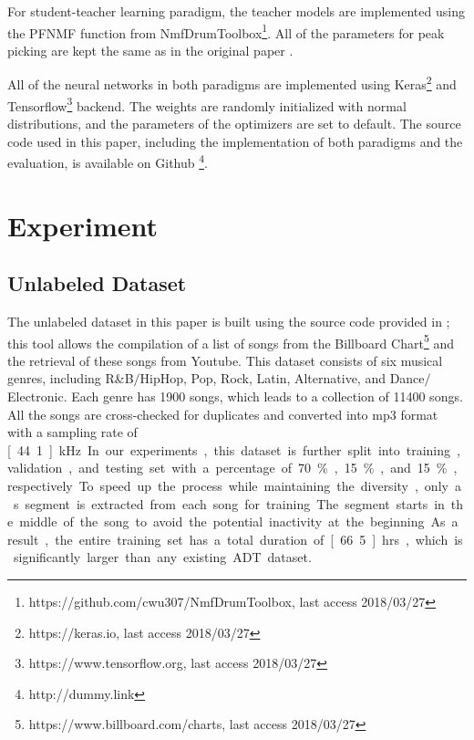\documentclass{article}
\begin{document}
For student-teacher learning paradigm, the teacher models are implemented using the PFNMF function from NmfDrumToolbox\footnote{https://github.com/cwu307/NmfDrumToolbox, last access 2018/03/27}. All of the parameters for peak picking are kept the same as in the original paper \cite{Wu2017}.

All of the neural networks in both paradigms are implemented using Keras\footnote{https://keras.io, last access 2018/03/27} and Tensorflow\footnote{https://www.tensorflow.org, last access 2018/03/27} backend. The weights are randomly initialized with normal distributions, and the parameters of the optimizers are set to default. The source code used in this paper, including the implementation of both paradigms and the evaluation, is available on Github \footnote{http://dummy.link}.

\section{Experiment}
\label{sec:experiment}

\subsection{Unlabeled Dataset}

The unlabeled dataset in this paper is built using the source code provided in \cite{Wu2017}; this tool allows the compilation of a list of songs from the Billboard Chart\footnote{https://www.billboard.com/charts, last access 2018/03/27} and the retrieval of these songs from Youtube. This dataset consists of six musical genres, including R\&B$\slash$HipHop, Pop, Rock, Latin, Alternative, and  Dance$\slash$Electronic. Each genre has 1900 songs, which leads to a collection of 11400 songs. All the songs are cross-checked for duplicates and converted into mp3 format with a sampling rate of \unit[44.1]{kHz}. In our experiments, this dataset is further split into training, validation, and testing set with a percentage of 70\%, 15\%, and 15\%, respectively. To speed up the process while maintaining the diversity, only a \unit[30]{s} segment is extracted from each song for training. The segment starts in the middle of the song to avoid the potential inactivity at the beginning. As a result, the entire training set has a total duration of \unit[66.5]{hrs}, which is significantly larger than any existing ADT dataset.
\end{document}
